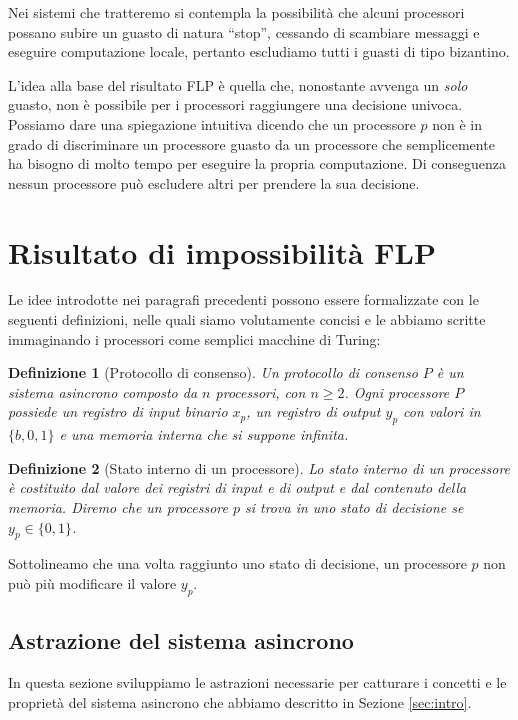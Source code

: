 \documentclass{article}
\newtheorem{definizione}{Definizione}
\begin{document}
Nei sistemi che tratteremo si contempla la possibilit\`a che alcuni
processori possano subire un guasto di natura ``stop'', cessando di
scambiare messaggi e eseguire computazione locale, pertanto escludiamo
tutti i guasti di tipo bizantino.

L'idea alla base del risultato FLP \`e quella che, nonostante avvenga
un \emph{solo} guasto, non \`e possibile per i processori raggiungere
una decisione univoca. Possiamo dare una spiegazione intuitiva dicendo
che un processore $p$ non \`e in grado di discriminare un processore
guasto da un processore che semplicemente ha bisogno di molto tempo
per eseguire la propria computazione. Di conseguenza nessun processore
pu\`o escludere altri per prendere la sua decisione. 

\section{Risultato di impossibilit\`a FLP}

Le idee introdotte nei paragrafi precedenti possono essere
formalizzate con le seguenti definizioni, nelle quali siamo
volutamente concisi e le abbiamo scritte immaginando i processori come
semplici macchine di Turing:

\begin{definizione}[Protocollo di consenso]
  Un protocollo di consenso $P$ è un sistema asincrono composto da $n$
  processori, con $n\geq2$. Ogni processore $P$ possiede un registro
  di input binario $x_p$, un registro di output $y_p$ con valori in
  $\{b,0,1\}$ e una memoria interna che si suppone infinita.
\end{definizione}

\begin{definizione}[Stato interno di un processore]
  Lo stato interno di un processore è costituito dal valore dei
  registri di input e di output e dal contenuto della memoria.  Diremo
  che un processore $p$ si trova in uno stato di decisione se $y_p \in
  \lbrace 0,1 \rbrace$. 
\end{definizione}

Sottolineamo che una volta raggiunto uno stato di decisione, un
processore $p$ non pu\`o pi\`u modificare il valore $y_p$.

\subsection{Astrazione del sistema asincrono}

In questa sezione sviluppiamo le astrazioni necessarie per catturare i
concetti e le propriet\`a del sistema asincrono che abbiamo descritto
in Sezione \ref{sec:intro}.
\end{document}
